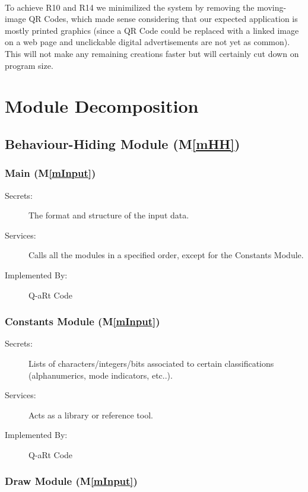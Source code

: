 \documentclass[12pt, titlepage]{article}
\newcommand{\mref}[1]{M\ref{#1}}
\begin{document}
\paragraph{}
To achieve R10 and R14 we minimilized the system by removing the moving-image QR 
Codes, which made sense considering that our expected application is mostly printed 
graphics (since a QR Code could be replaced with a linked image on a web page and 
unclickable digital advertisements are not yet as common). This will not make any 
remaining creations faster but will certainly cut down on program size.

\section{Module Decomposition} \label{SecMD}


\subsection{Behaviour-Hiding Module (\mref{mHH})}

\subsubsection{Main (\mref{mInput})}

\begin{description}
\item[Secrets:] The format and structure of the input data.
\item[Services:] Calls all the modules in a specified order, except for the Constants Module.
\item[Implemented By:] Q-aRt Code
\end{description}

\subsubsection{Constants Module (\mref{mInput})}

\begin{description}
\item[Secrets:] Lists of characters/integers/bits associated to certain classifications (alphanumerics, mode indicators, etc..).
\item[Services:] Acts as a library or reference tool.
\item[Implemented By:] Q-aRt Code
\end{description}

\subsubsection{Draw Module (\mref{mInput})}
\end{document}

